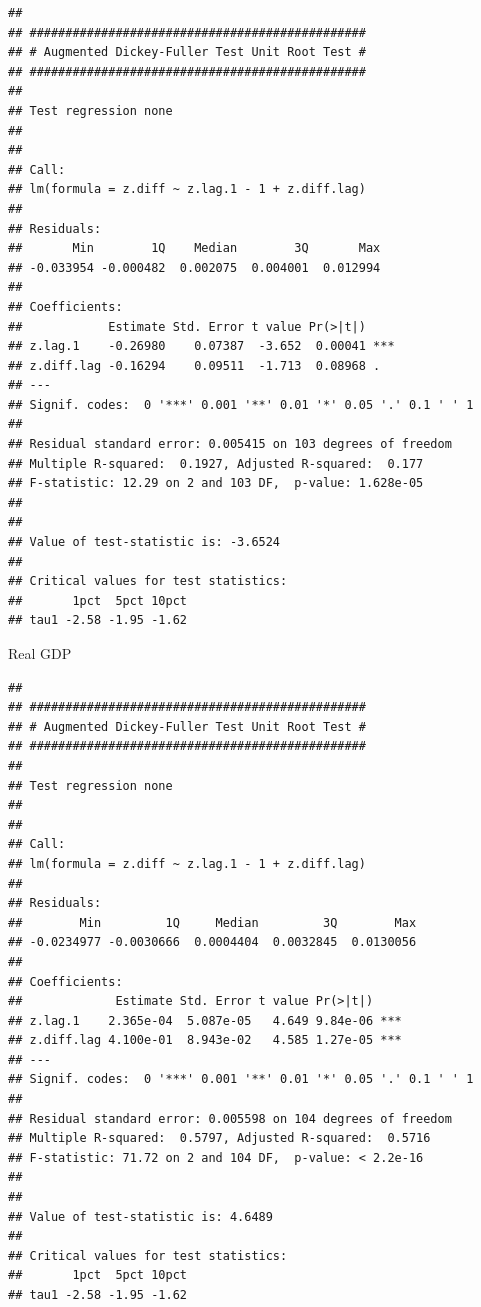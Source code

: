 \documentclass[11pt,preprint, authoryear]{elsarticle}
\numberwithin{equation}{section}
\numberwithin{figure}{section}
\numberwithin{table}{section}
\begin{document}
\begin{verbatim}
## 
## ############################################### 
## # Augmented Dickey-Fuller Test Unit Root Test # 
## ############################################### 
## 
## Test regression none 
## 
## 
## Call:
## lm(formula = z.diff ~ z.lag.1 - 1 + z.diff.lag)
## 
## Residuals:
##       Min        1Q    Median        3Q       Max 
## -0.033954 -0.000482  0.002075  0.004001  0.012994 
## 
## Coefficients:
##            Estimate Std. Error t value Pr(>|t|)    
## z.lag.1    -0.26980    0.07387  -3.652  0.00041 ***
## z.diff.lag -0.16294    0.09511  -1.713  0.08968 .  
## ---
## Signif. codes:  0 '***' 0.001 '**' 0.01 '*' 0.05 '.' 0.1 ' ' 1
## 
## Residual standard error: 0.005415 on 103 degrees of freedom
## Multiple R-squared:  0.1927, Adjusted R-squared:  0.177 
## F-statistic: 12.29 on 2 and 103 DF,  p-value: 1.628e-05
## 
## 
## Value of test-statistic is: -3.6524 
## 
## Critical values for test statistics: 
##       1pct  5pct 10pct
## tau1 -2.58 -1.95 -1.62
\end{verbatim}

Real GDP

\begin{verbatim}
## 
## ############################################### 
## # Augmented Dickey-Fuller Test Unit Root Test # 
## ############################################### 
## 
## Test regression none 
## 
## 
## Call:
## lm(formula = z.diff ~ z.lag.1 - 1 + z.diff.lag)
## 
## Residuals:
##        Min         1Q     Median         3Q        Max 
## -0.0234977 -0.0030666  0.0004404  0.0032845  0.0130056 
## 
## Coefficients:
##             Estimate Std. Error t value Pr(>|t|)    
## z.lag.1    2.365e-04  5.087e-05   4.649 9.84e-06 ***
## z.diff.lag 4.100e-01  8.943e-02   4.585 1.27e-05 ***
## ---
## Signif. codes:  0 '***' 0.001 '**' 0.01 '*' 0.05 '.' 0.1 ' ' 1
## 
## Residual standard error: 0.005598 on 104 degrees of freedom
## Multiple R-squared:  0.5797, Adjusted R-squared:  0.5716 
## F-statistic: 71.72 on 2 and 104 DF,  p-value: < 2.2e-16
## 
## 
## Value of test-statistic is: 4.6489 
## 
## Critical values for test statistics: 
##       1pct  5pct 10pct
## tau1 -2.58 -1.95 -1.62
\end{verbatim}
\end{document}
